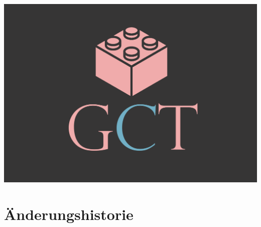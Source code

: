 



\maketitle

\includegraphics[width=18cm]{pictures/LogoRiesig.png}

\newpage
\section{Änderungshistorie}

